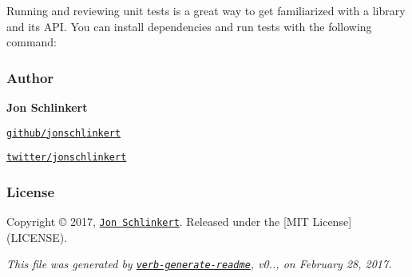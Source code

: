 Running and reviewing unit tests is a great way to get familiarized with a library and its A\+PI. You can install dependencies and run tests with the following command\+:




\subsubsection*{Author}

{\bfseries Jon Schlinkert}


\begin{DoxyItemize}
\item \href{https://github.com/jonschlinkert}{\tt github/jonschlinkert}
\item \href{https://twitter.com/jonschlinkert}{\tt twitter/jonschlinkert}
\end{DoxyItemize}

\subsubsection*{License}

Copyright © 2017, \href{https://github.com/jonschlinkert}{\tt Jon Schlinkert}. Released under the \mbox{[}M\+IT License\mbox{]}(L\+I\+C\+E\+N\+SE).





{\itshape This file was generated by \href{https://github.com/verbose/verb-generate-readme}{\tt verb-\/generate-\/readme}, v0.., on February 28, 2017.} 